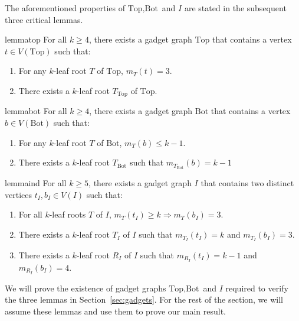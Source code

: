 \documentclass[11pt,letter]{article}
\theoremstyle{remark}
\newcommand{\T}{\text{Top}}
\newcommand{\B}{\text{Bot}}
\begin{document}
The aforementioned properties of $\T, \B$ and $I$ are stated in the subsequent three critical lemmas.

\begin{restatable}{lemma}{top}
    \label{lem:top}
For all $k\geq 4 $, there exists a gadget graph $\T$ that contains a vertex $t\in V(\T)$ such that:
\begin{enumerate}
        \item For any $k$-leaf root $T$ of $\T$, $m_{T}(t) = 3$.
        \item There exists a $k$-leaf root $T_{\T}$ of  $\T$.
    \end{enumerate}
\end{restatable}

\begin{restatable}{lemma}{bot}\label{lem:bottom}
For all $k\geq 4$, there exists a gadget graph $\B$ that contains a vertex $b \in V(\B)$ such that:
\begin{enumerate}
        \item For any $k$-leaf root $T$ of $\B$, $m_T(b) \leq k-1$.
        \item There exists a $k$-leaf root $T_{\B}$ such that $m_{T_{\B}}(b) = k-1$
\end{enumerate}
\end{restatable}   
\begin{restatable}{lemma}{ind}\label{lem:induction}
For all $k\geq 5$, there exists a gadget graph $I$ that contains two distinct vertices $t_I,b_I\in V(I)$ such that:
\begin{enumerate}
        \item For all $k$-leaf roots $T$ of $I$, $m_T(t_I)\geq k\Longrightarrow m_T(b_I)=3$.
        \item There exists a $k$-leaf root $T_I$ of $I$ such that $m_{T_I}(t_I)=k$ and $m_{T_I}(b_I)=3$.
        \item There exists a $k$-leaf root $R_I$ of $I$ such that $m_{R_I}(t_I)=k-1$ and $m_{R_I}(b_I)=4$.
    \end{enumerate}    
\end{restatable}

We will prove the existence of gadget graphs
$\T, \B$ and $I$ required to verify the three lemmas in Section~\ref{sec:gadgets}.
For the rest of the section, we will assume these lemmas and use them to prove our main result.
\end{document}
